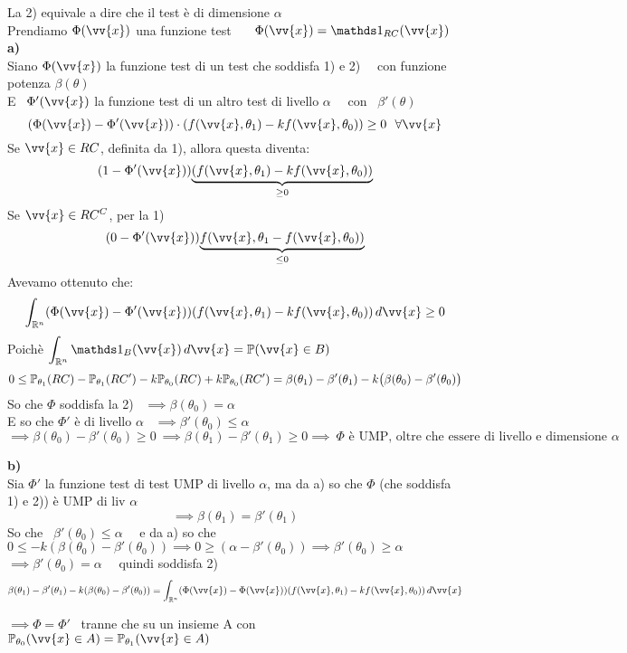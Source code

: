 \begin{Dim}
    La 2) equivale a dire che il test è di dimensione $\alpha$\\
    Prendiamo $\Phi(\vv{x})$ una funzione test \ \ \ $\Phi(\vv{x})=\II_{RC}(\vv{x})$\\

    \textbf{a)}\\
    Siano $\Phi(\vv{x})$ la funzione test di un test che soddisfa  1) e 2)  \ \ con funzione potenza $\beta(\theta)$ \\
    E \ $\Phi'(\vv{x})$ la funzione test di un altro test di livello $\alpha$ \ \ con \ $\beta'(\theta)$
    \[
    (\Phi(\vv{x})-\Phi'(\vv{x}))\cdot (f(\vv{x},\theta_1)-k  f(\vv{x},\theta_0))\ge 0 \ \ \forall \vv{x}
    \]
    Se $\vv{x}\in RC$, definita da 1), allora questa diventa:
    \[
    (1-\Phi'(\vv{x}))\underset{\ge0}{\underbrace{(f(\vv{x},\theta_1)-kf(\vv{x},\theta_0))}}
    \]
    Se $\vv{x}\in RC^C$, per la 1)
    \[
    (0-\Phi'(\vv{x}))\underset{\le 0}{\underbrace{f(\vv{x},\theta_1-f(\vv{x},\theta_0))}}
    \]
    Avevamo ottenuto che:
    \[
    \int_{\R^n} (\Phi(\vv{x})-\Phi'(\vv{x}))(f(\vv{x},\theta_1)-k  f(\vv{x},\theta_0)) \, d\vv{x}\ge 0
    \]
    Poichè $\int_{\R^n}\II_{B}(\vv{x})\, d\vv{x} = \PP(\vv{x}\in B)$
    \[
    0\le \mathbb P_{\theta_1}(RC) - \mathbb P_{\theta_1}(RC') - k\mathbb P_{\theta_0}(RC) + k\mathbb P_{\theta_0}(RC') = \beta(\theta_1) - \beta'(\theta_1) - k\big(\beta(\theta_0)- \beta'(\theta_0)\big)
    \]
    So che $\Phi$ soddisfa la 2) \ $\implies \beta(\theta_0)=\alpha$\\
    E so che $\Phi'$ è di livello $\alpha$ \ $\implies \beta'(\theta_0)\le \alpha$
    \[
    \implies \beta(\theta_0)-\beta'(\theta_0)\ge 0 \ \implies \beta(\theta_1) - \beta'(\theta_1) \ge 0 \implies \ \Phi \text{ è UMP, oltre che essere di livello e dimensione } \alpha    \]

    \phantom{}

    \textbf{b)}\\
    Sia $\Phi'$ la funzione test di test UMP di livello $\alpha$, ma da a) so che $\Phi$ (che soddisfa 1) e 2)) è UMP di liv $\alpha$
    \[
    \implies \beta(\theta_1)=\beta'(\theta_1)
    \]
    So che \ $\beta'(\theta_0)\le \alpha$ \ \ e da a) so che $0\le -k(\beta(\theta_0)-\beta'(\theta_0)) \implies 0\ge(\alpha-\beta'(\theta_0))\implies \beta'(\theta_0)\ge\alpha$ \\
    $\implies \beta'(\theta_0) =\alpha$ \ \  
    quindi soddisfa 2)\\

    \[
    \beta(\theta_1) -\beta'(\theta_1) - k(\beta(\theta_0)- \beta'(\theta_0)) = \int_{\R^n} (\Phi(\vv{x})-\Phi(\vv{x}))(f(\vv{x},\theta_1)-kf(\vv{x},\theta_0))\,d\vv{x}
    \]

    $\implies \Phi = \Phi'$ \ tranne che su un insieme A con $\PP_{\theta_0}(\vv{x}\in A)=\PP_{\theta_1}(\vv{x}\in A)$
\end{Dim}
\phantom{}

